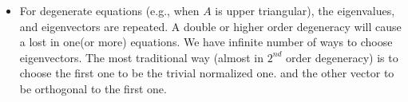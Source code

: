 \documentclass[a4paper,12pt]{article}
\begin{document}
\begin{itemize}
\begin{itemize}
\begin{itemize}
			\item For degenerate equations (e.g., when $A$ is upper triangular), the eigenvalues, and eigenvectors are repeated.
A double or higher order degeneracy will cause a lost in one(or more) equations. We have infinite number of ways to
choose eigenvectors. The most traditional way (almost in $2^{nd}$ order degeneracy) is to choose the first one to be the
trivial normalized one. and the other vector to be orthogonal to the first one.

		\end{itemize}
	\end{itemize}
\end{itemize}
\end{document}
